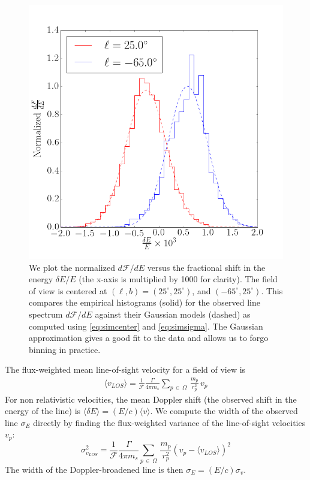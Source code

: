 \documentclass[aps,prd,10pt,twocolumn,superscriptaddress,showpacs]{revtex4-1}
\begin{document}
\begin{figure}[h!]
\centering
\includegraphics[width=1.0\columnwidth]{dnde_demo.png}
\caption{We plot the normalized $d\mathcal{F}/dE$ versus the fractional shift in the energy $\delta
E/E$ (the x-axis is multiplied by 1000 for clarity). The field of view is centered at $(\ell, b) =
(25^\circ, 25^\circ)$, and $(-65^\circ, 25^\circ)$.
	This compares the empirical histograms (solid) for the observed line spectrum
	$d\mathcal{F}/dE$ against their Gaussian models (dashed) as computed using \eqref{eq:simcenter} and \eqref{eq:simsigma}.
	The Gaussian approximation gives a good fit to the data and allows us to forgo binning in practice.}
\label{fig:dfde}
\end{figure}

The flux-weighted mean line-of-sight velocity for a field of view is 
\begin{eqnarray} 
	\langle v_{LOS} \rangle =\frac{1}{\mathcal{F}} \frac{\Gamma}{4\pi m_s} \sum_{p \, \in \, \Omega}
	\, \frac{m_p}{r_p^{2}} \, v_p
\label{eq:simcenter}
\end{eqnarray}
For non relativistic velocities, the mean Doppler shift (the observed shift in the energy of the line) is $\langle \delta E\rangle = (E/c)\langle v \rangle$.  We compute the width of the observed line $\sigma_E$ directly by finding the flux-weighted
variance of the line-of-sight velocities $v_p$:
\begin{equation} 
	\sigma_{v_{LOS}}^2 =\frac{1}{\mathcal{F}} \frac{\Gamma}{4\pi m_s} \sum_{p \, \in \, \Omega}
	\, \frac{m_p}{r_p^{2}} \left(v_p-\langle v_{LOS}\rangle\right)^2 
\label{eq:simsigma}
\end{equation}
The width of the Doppler-broadened line is then $\sigma_E = (E/c) \sigma_v$. 
\end{document}
